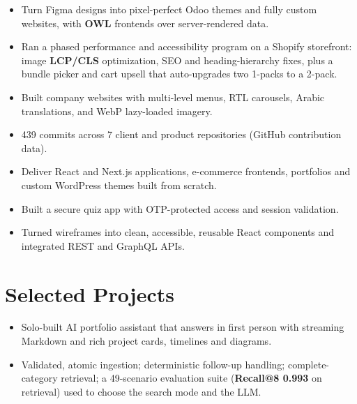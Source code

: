 \documentclass[10pt,a4paper]{article}
\begin{document}
\begin{itemize}
  \item Turn Figma designs into pixel-perfect Odoo themes and fully custom websites, with \textbf{OWL} frontends over server-rendered data.
  \item Ran a phased performance and accessibility program on a Shopify storefront: image \textbf{LCP/CLS} optimization, SEO
        and heading-hierarchy fixes, plus a bundle picker and cart upsell that auto-upgrades two 1-packs to a 2-pack.
  \item Built company websites with multi-level menus, RTL carousels, Arabic translations, and WebP lazy-loaded imagery.
  \item 439 commits across 7 client and product repositories (GitHub contribution data).
\end{itemize}

\begin{itemize}
  \item Deliver React and Next.js applications, e-commerce frontends, portfolios and custom WordPress themes built from scratch.
  \item Built a secure quiz app with OTP-protected access and session validation.
\end{itemize}

\begin{itemize}
  \item Turned wireframes into clean, accessible, reusable React components and integrated REST and GraphQL APIs.
\end{itemize}

\section*{Selected Projects}
\begin{itemize}
  \item Solo-built AI portfolio assistant that answers in first person with streaming Markdown and rich project cards, timelines and diagrams.
  \item Validated, atomic ingestion; deterministic follow-up handling; complete-category retrieval; a 49-scenario evaluation suite
        (\textbf{Recall@8 0.993} on retrieval) used to choose the search mode and the LLM.
\end{itemize}
\end{document}
